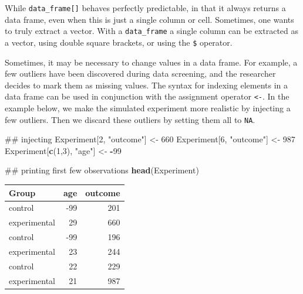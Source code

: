 \documentclass[]{svmono}
\newenvironment{Shaded}{\begin{snugshade}}{\end{snugshade}}
\newcommand{\KeywordTok}[1]{\textcolor[rgb]{0.13,0.29,0.53}{\textbf{#1}}}
\newcommand{\DecValTok}[1]{\textcolor[rgb]{0.00,0.00,0.81}{#1}}
\newcommand{\StringTok}[1]{\textcolor[rgb]{0.31,0.60,0.02}{#1}}
\newcommand{\OperatorTok}[1]{\textcolor[rgb]{0.81,0.36,0.00}{\textbf{#1}}}
\newcommand{\NormalTok}[1]{#1}
\theoremstyle{definition}
\theoremstyle{definition}
\theoremstyle{definition}
\theoremstyle{remark}
\begin{document}
While \texttt{data\_frame{[}{]}} behaves perfectly predictable, in that
it always returns a data frame, even when this is just a single column
or cell. Sometimes, one wants to truly extract a vector. With a
\texttt{data\_frame} a single column can be extracted as a vector, using
double square brackets, or using the \texttt{\$} operator.

\begin{Shaded}
\end{Shaded}

Sometimes, it may be necessary to change values in a data frame. For
example, a few outliers have been discovered during data screening, and
the researcher decides to mark them as missing values. The syntax for
indexing elements in a data frame can be used in conjunction with the
assignment operator \texttt{\textless{}-}. In the example below, we make
the simulated experiment more realistic by injecting a few outliers.
Then we discard these outliers by setting them all to \texttt{NA}.

\begin{Shaded}
\begin{Highlighting}[]
\NormalTok{## injecting}
\NormalTok{Experiment[}\DecValTok{2}\NormalTok{,      }\StringTok{"outcome"}\NormalTok{] <-}\StringTok{ }\DecValTok{660}
\NormalTok{Experiment[}\DecValTok{6}\NormalTok{,      }\StringTok{"outcome"}\NormalTok{] <-}\StringTok{ }\DecValTok{987}
\NormalTok{Experiment[}\KeywordTok{c}\NormalTok{(}\DecValTok{1}\NormalTok{,}\DecValTok{3}\NormalTok{), }\StringTok{"age"}\NormalTok{]     <-}\StringTok{ }\OperatorTok{-}\DecValTok{99}

\NormalTok{## printing first few observations}
\KeywordTok{head}\NormalTok{(Experiment)}
\end{Highlighting}
\end{Shaded}

\begin{tabular}{l|r|r}
\hline
Group & age & outcome\\
\hline
control & -99 & 201\\
\hline
experimental & 29 & 660\\
\hline
control & -99 & 196\\
\hline
experimental & 23 & 244\\
\hline
control & 22 & 229\\
\hline
experimental & 21 & 987\\
\hline
\end{tabular}
\end{document}
